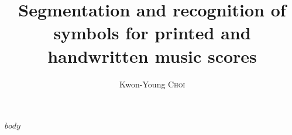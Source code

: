 \documentclass[11pt]{template/sdm}
\title{Segmentation and recognition of symbols for printed and handwritten music scores}
\author{Kwon-Young \textsc{Choi}}
\begin{document}
\maketitle







$body$

%
%
\end{document}

